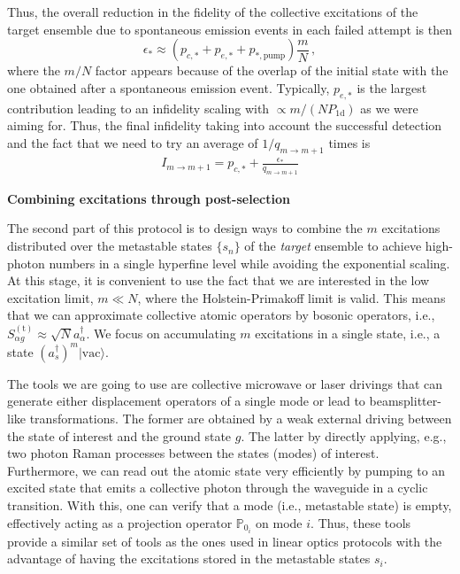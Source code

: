 \documentclass[twocolumn,pra,aps,superscriptaddress,showpacs]{revtex4-1}
\newcommand{\ket}[1]{|#1\rangle}
\def\oned{\mathrm{1d}}
\newcommand{\trg}{\mathrm{(t)}}
\begin{document}
Thus, the overall reduction in the fidelity of the collective excitations of the target ensemble due to spontaneous emission events in each failed attempt is then
\begin{equation}
\epsilon_* 
\approx ( p_{c,*}+p_{e,*}+p_{*,\mathrm{pump}})\frac{m}{N}\,,
\end{equation}
%
where the $m/N$ factor appears because of the overlap of the initial state with the one obtained after a spontaneous emission event. Typically, $p_{e,*}$ is the largest contribution leading to an infidelity scaling with $\propto m/(N P_\oned)$ as we were aiming for. Thus, the final infidelity taking into account the successful detection and the fact that we need to try an average of $1/q_{m\rightarrow m+1}$ times is
%
\begin{align}
I_{m\rightarrow m+1}
	=p_{c,*}+\frac{\epsilon_{*}}{q_{m\rightarrow m+1} }
\end{align}

\textbf{Combining excitations through post-selection}

The second part of this protocol is to design ways to combine the $m$ excitations distributed over the metastable states  $\{ s_n\}$ of the \emph{target} ensemble to achieve high-photon numbers in a single hyperfine level while avoiding the exponential scaling. At this stage, it is convenient to use the fact that we are interested in the low excitation limit, $m\ll N$, where the Holstein-Primakoff limit \cite{Holstein1940} is valid. This means that we can approximate collective atomic operators by bosonic operators, i.e., $S_{\alpha g}^\trg \approx \sqrt{N} a^\dagger_\alpha$.  We focus on accumulating $m$ excitations in a single state, i.e., a state $(a^\dagger_s)^m\ket{\mathrm{vac}}$.

The tools we are going to use are collective microwave or laser drivings that can generate either displacement operators of a single mode or lead to beamsplitter-like transformations. The former are obtained by a weak external driving between the state of interest and the ground state $g$. The latter by directly applying, e.g., two photon Raman processes between the states (modes) of interest. Furthermore, we can read out the atomic state very efficiently by pumping to an excited state that emits a collective photon through the waveguide in a cyclic transition. With this, one can verify that a mode (i.e., metastable state) is empty, effectively acting as a projection operator $\mathbb{P}_{0_i}$ on mode $i$. Thus, these tools provide a similar set of tools as the ones used in linear optics protocols with the advantage of having the excitations stored in the metastable states $s_i$.
\end{document}
